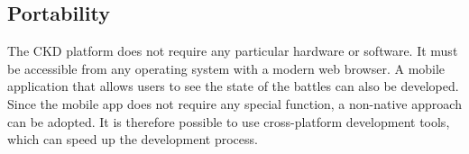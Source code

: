 \subsection{Portability}
The CKD platform does not require any particular hardware or software.
It must be accessible from any operating system with a modern web browser.
A mobile application that allows users to see the state of the battles can also be developed.
Since the mobile app does not require any special function, a non-native approach can be adopted.
It is therefore possible to use cross-platform development tools, which can speed up the development process.